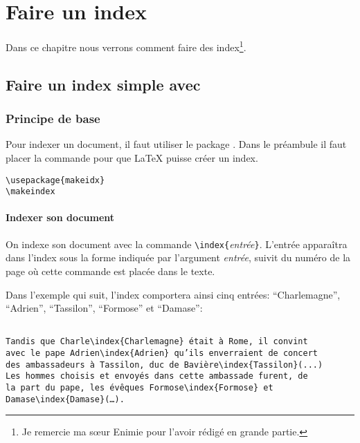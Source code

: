 
\chapter{Faire un index}

\begin{prealable}

Dans ce chapitre nous verrons comment faire des index\footnote{Je remercie ma sœur Enimie pour l'avoir rédigé en grande partie.}.

\end{prealable}


\section{Faire un index simple avec }


\subsection{Principe de base}


Pour indexer un document, il faut utiliser le package . Dans le préambule il faut placer la commande  pour que \LaTeX{} puisse créer un index.

\begin{verbatim}
\usepackage{makeidx}
\makeindex
\end{verbatim}

\subsubsection{Indexer son document}



On indexe son document avec  la commande \verb+\index{+\emph{entrée}\verb+}+. L'entrée apparaîtra dans l'index sous la forme indiquée par l'argument \emph{entrée}, suivit du numéro de la page où cette commande est placée dans le texte. 

Dans l'exemple qui suit, l'index comportera ainsi cinq entrées: \enquote{Charlemagne}, \enquote{Adrien}, \enquote{Tassilon}, \enquote{Formose} et \enquote{Damase}:

\begin{verbatim}

Tandis que Charle\index{Charlemagne} était à Rome, il convint
avec le pape Adrien\index{Adrien} qu’ils enverraient de concert
des ambassadeurs à Tassilon, duc de Bavière\index{Tassilon}(...)
Les hommes choisis et envoyés dans cette ambassade furent, de 
la part du pape, les évêques Formose\index{Formose} et 
Damase\index{Damase}(…).

\end{verbatim}

